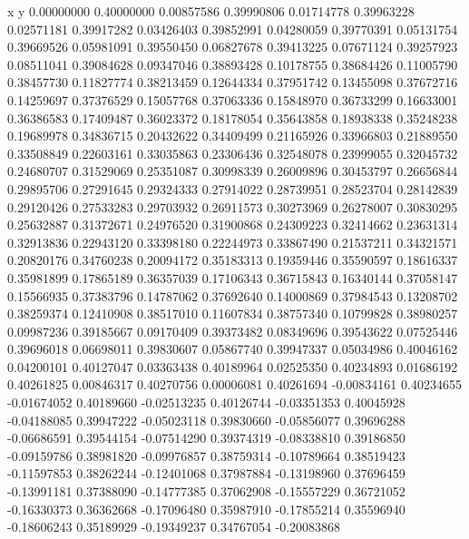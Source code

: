 x y      
0.00000000   0.40000000  
0.00857586   0.39990806  
0.01714778   0.39963228  
0.02571181   0.39917282  
0.03426403   0.39852991  
0.04280059   0.39770391  
0.05131754   0.39669526  
0.05981091   0.39550450  
0.06827678   0.39413225  
0.07671124   0.39257923  
0.08511041   0.39084628  
0.09347046   0.38893428  
0.10178755   0.38684426  
0.11005790   0.38457730  
0.11827774   0.38213459  
0.12644334   0.37951742  
0.13455098   0.37672716  
0.14259697   0.37376529  
0.15057768   0.37063336  
0.15848970   0.36733299  
0.16633001   0.36386583  
0.17409487   0.36023372  
0.18178054   0.35643858  
0.18938338   0.35248238  
0.19689978   0.34836715  
0.20432622   0.34409499  
0.21165926   0.33966803  
0.21889550   0.33508849  
0.22603161   0.33035863  
0.23306436   0.32548078  
0.23999055   0.32045732  
0.24680707   0.31529069  
0.25351087   0.30998339  
0.26009896   0.30453797  
0.26656844   0.29895706  
0.27291645   0.29324333  
0.27914022   0.28739951  
0.28523704   0.28142839  
0.29120426   0.27533283  
0.29703932   0.26911573  
0.30273969   0.26278007  
0.30830295   0.25632887  
0.31372671   0.24976520  
0.31900868   0.24309223  
0.32414662   0.23631314  
0.32913836   0.22943120  
0.33398180   0.22244973  
0.33867490   0.21537211  
0.34321571   0.20820176  
0.34760238   0.20094172  
0.35183313   0.19359446  
0.35590597   0.18616337  
0.35981899   0.17865189  
0.36357039   0.17106343  
0.36715843   0.16340144  
0.37058147   0.15566935  
0.37383796   0.14787062  
0.37692640   0.14000869  
0.37984543   0.13208702  
0.38259374   0.12410908  
0.38517010   0.11607834  
0.38757340   0.10799828  
0.38980257   0.09987236  
0.39185667   0.09170409  
0.39373482   0.08349696  
0.39543622   0.07525446  
0.39696018   0.06698011  
0.39830607   0.05867740  
0.39947337   0.05034986  
0.40046162   0.04200101  
0.40127047   0.03363438  
0.40189964   0.02525350  
0.40234893   0.01686192  
0.40261825   0.00846317  
0.40270756   0.00006081  
0.40261694   -0.00834161 
0.40234655   -0.01674052 
0.40189660   -0.02513235 
0.40126744   -0.03351353 
0.40045928   -0.04188085 
0.39947222   -0.05023118 
0.39830660   -0.05856077 
0.39696288   -0.06686591 
0.39544154   -0.07514290 
0.39374319   -0.08338810 
0.39186850   -0.09159786 
0.38981820   -0.09976857 
0.38759314   -0.10789664 
0.38519423   -0.11597853 
0.38262244   -0.12401068 
0.37987884   -0.13198960 
0.37696459   -0.13991181 
0.37388090   -0.14777385 
0.37062908   -0.15557229 
0.36721052   -0.16330373 
0.36362668   -0.17096480 
0.35987910   -0.17855214 
0.35596940   -0.18606243 
0.35189929   -0.19349237 
0.34767054   -0.20083868 
